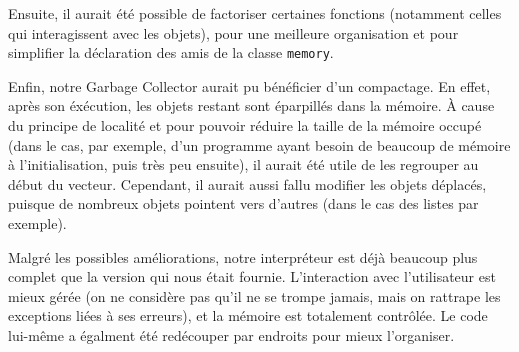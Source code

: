 \documentclass[12pt]{article}
\def\code #1{\lstinline{#1}}
\begin{document}
Ensuite, il aurait été possible de factoriser certaines fonctions (notamment celles qui interagissent avec les objets), pour une meilleure organisation et pour simplifier la déclaration des amis de la classe \code{memory}.

Enfin, notre Garbage Collector aurait pu bénéficier d'un compactage. En effet, après son éxécution, les objets restant sont éparpillés dans la mémoire. À cause du principe de localité et pour pouvoir réduire la taille de la mémoire occupé (dans le cas, par exemple, d'un programme ayant besoin de beaucoup de mémoire à l'initialisation, puis très peu ensuite), il aurait été utile de les regrouper au début du vecteur. Cependant, il aurait aussi fallu modifier les objets déplacés, puisque de nombreux objets pointent vers d'autres (dans le cas des listes par exemple).

Malgré les possibles améliorations, notre interpréteur est déjà beaucoup plus complet que la version qui nous était fournie. L'interaction avec l'utilisateur est mieux gérée (on ne considère pas qu'il ne se trompe jamais, mais on rattrape les exceptions liées à ses erreurs), et la mémoire est totalement contrôlée. Le code lui-même a égalment été redécouper par endroits pour mieux l'organiser.
\end{document}
